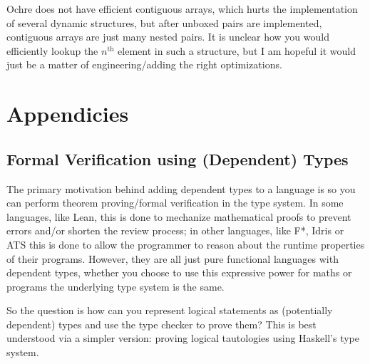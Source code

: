 \documentclass[12pt,twoside]{report}
\begin{document}
Ochre does not have efficient contiguous arrays, which hurts the implementation of several dynamic structures, but after unboxed pairs are implemented, contiguous arrays are just many nested pairs. It is unclear how you would efficiently lookup the $n^{\text{th}}$ element in such a structure, but I am hopeful it would just be a matter of engineering/adding the right optimizations.






\appendix 
{}

\chapter{Appendicies}
\section{Formal Verification using (Dependent) Types}
\label{verificationwithtypes}

The primary motivation behind adding dependent types to a language is so you can perform theorem proving/formal verification in the type system. In some languages, like Lean, this is done to mechanize mathematical proofs to prevent errors and/or shorten the review process; in other languages, like F*, Idris or ATS this is done to allow the programmer to reason about the runtime properties of their programs. However, they are all just pure functional languages with dependent types, whether you choose to use this expressive power for maths or programs the underlying type system is the same.

So the question is how can you represent logical statements as (potentially dependent) types and use the type checker to prove them? This is best understood via a simpler version: proving logical tautologies using Haskell's type system.
\end{document}
